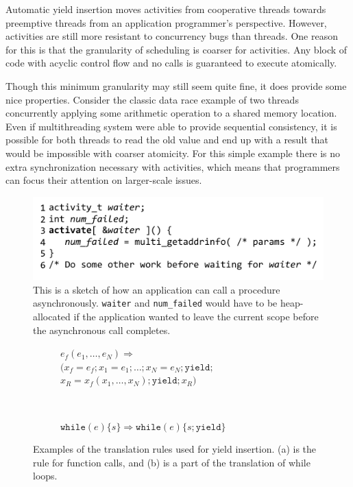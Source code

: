\documentclass[9pt,preprint]{sigplanconf}
\begin{document}
Automatic yield insertion moves activities from cooperative threads towards preemptive threads from an application programmer's perspective.
However, activities are still more resistant to concurrency bugs than threads.
One reason for this is that the granularity of scheduling is coarser for activities.
Any block of code with acyclic control flow and no calls is guaranteed to execute atomically.

Though this minimum granularity may still seem quite fine, it does provide some nice properties.
Consider the classic data race example of two threads concurrently applying some arithmetic operation to a shared memory location.
Even if multithreading system were able to provide sequential consistency, it is possible for both threads to read the old value and end up with a result that would be impossible with coarser atomicity.
For this simple example there is no extra synchronization necessary with activities, which means that programmers can focus their attention on larger-scale issues.

\begin{figure}
\includegraphics{multi_getaddrinfo_async_call}
\caption{This is a sketch of how an application can call a procedure asynchronously.
\texttt{waiter} and \texttt{num\_failed} would have to be heap-allocated if the application wanted to leave the current scope before the asynchronous call completes.}
\label{fig:charcoal_multidns_async_call}
\end{figure}

\begin{figure}
    \centering
    \begin{subfigure}[b]{0.5\textwidth}
  $e_f(e_1, \ldots, e_N) \Rightarrow$ \\
  \hspace*{1em} $( x_f=e_f; x_1=e_1; \ldots; x_N=e_N; \mathtt{yield};$ \\
  \hspace*{2em} $x_R=x_f(x_1, \ldots, x_N); \mathtt{yield}; x_R )$
        \caption{}
    \end{subfigure}
    ~ %
    \begin{subfigure}[b]{0.5\textwidth}
  $\mathtt{while}( e ) \{ s \} \Rightarrow \mathtt{while}( e ) \{ s; \mathtt{yield} \}$
        \caption{}
    \end{subfigure}
    \caption{Examples of the translation rules used for yield insertion.
      (a) is the rule for function calls, and (b) is a part of the translation of while loops.}
    \label{fig:translation}
\end{figure}
\end{document}
